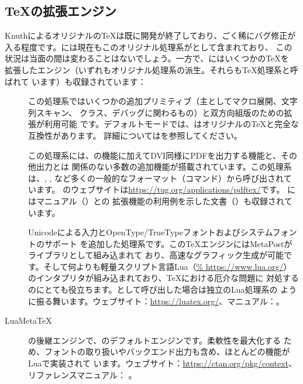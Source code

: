 \documentclass[uplatex,dvipdfmx,12pt,tombow]{jsarticle}
\begin{document}
\subsection{\TeX の拡張エンジン}
\label{sec:tex-extensions}

Knuthによるオリジナルの\TeX は既に開発が終了しており、ごく稀にバグ修正が
入る程度です。\TL には現在もこのオリジナル処理系がとして含まれており、
この状況は当面の間は変わることはないでしょう。一方で、\TL にはいくつかの\TeX を
拡張したエンジン（いずれもオリジナル処理系の派生。それらも\TeX 処理系と呼ばれて
います）も収録されています：
%
\begin{description}
\item[\eTeX]\label{text:etex}
この処理系ではいくつかの追加プリミティブ（主としてマクロ展開、文字列スキャン、
クラス、デバッグに関わるもの）と双方向組版のための\TeXXeT 拡張が利用可能
です。デフォルトモードでは、\eTeX はオリジナルの\TeX と完全な互換性があります。
詳細についてはを参照してください。

\item[\pdfTeX]
この処理系には、\eTeX の機能に加えてDVI同様にPDFを出力する機能と、その他出力とは
関係のない多数の追加機能が搭載されています。この処理系は、, ,
など多くの一般的なフォーマット（コマンド）から呼び出されています。
\pdfTeX のウェブサイトは\url{https://tug.org/applications/pdftex/}です。\TL
にはマニュアル（）と\pdfTeX の
拡張機能の利用例を示した文書（）も収録されています。

\item[\LuaTeX]
Unicodeによる入力とOpenType\slash TrueTypeフォントおよびシステムフォントのサポート
を追加した処理系です。この\TeX エンジンにはMetaPostがライブラリとして組み込まれて
おり、高速なグラフィック生成が可能です。そして何よりも軽量スクリプト言語Lua（\url{%
https://www.lua.org/}）のインタプリタが組み込まれており、\TeX における厄介な問題に
対処するのにとても役立ちます。として呼び出した場合は独立のLua処理系の
ように振る舞います。ウェブサイト：\url{https://luatex.org/}、マニュアル：。

\item[LuaMeta\TeX]
\LuaTeX の後継エンジンで、\ConTeXt のデフォルトエンジンです。柔軟性を最大化する
ため、フォントの取り扱いやバックエンド出力も含め、ほとんどの機能がLuaで実装されて
います。ウェブサイト：\url{https://ctan.org/pkg/context}、リファレンスマニュアル：
。


\end{description}
\end{document}
